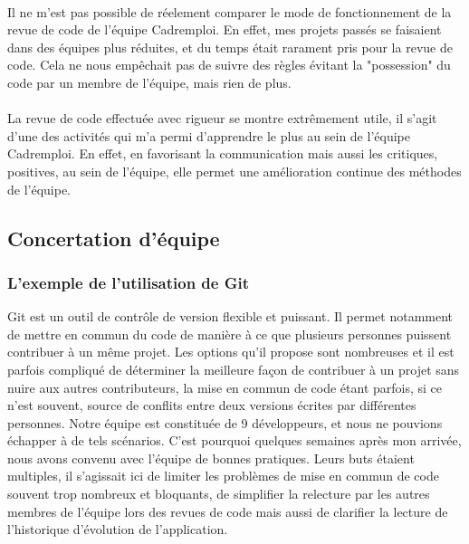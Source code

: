 \paragraph{}
Il ne m'est pas possible de réelement comparer le mode de fonctionnement de la revue de code de l'équipe Cadremploi.
En effet, mes projets passés se faisaient dans des équipes plus réduites, et du temps était rarament pris pour la revue de code.
Cela ne nous empêchait pas de suivre des règles évitant la "possession" du code par un membre de l'équipe, mais rien de plus.
\paragraph{}
La revue de code effectuée avec rigueur se montre extrêmement utile, il s'agit d'une des activités qui m'a permi d'apprendre le plus au sein de l'équipe Cadremploi.
En effet, en favorisant la communication mais aussi les critiques, positives, au sein de l'équipe, elle permet une amélioration continue des méthodes de l'équipe.

\subsection{Concertation d'équipe}
\label{sub:Concertation d'équipe}
\subsubsection{L'exemple de l'utilisation de Git}
\label{subs:Utilisation de Git}
Git est un outil de contrôle de version flexible et puissant.
Il permet notamment de mettre en commun du code de manière à ce que plusieurs personnes puissent contribuer à un même projet.
Les options qu'il propose sont nombreuses et il est parfois compliqué de déterminer la meilleure façon de contribuer à un projet sans nuire aux autres contributeurs, la mise en commun de code étant parfois, si ce n'est souvent, source de conflits entre deux versions écrites par différentes personnes.
Notre équipe est constituée de 9 développeurs, et nous ne pouvions échapper à de tels scénarios.
C'est pourquoi quelques semaines après mon arrivée, nous avons convenu avec l'équipe de bonnes pratiques.
Leurs buts étaient multiples, il s'agissait ici de limiter les problèmes de mise en commun de code souvent trop nombreux et bloquants, de simplifier la relecture par les autres membres de l'équipe lors des revues de code mais aussi de clarifier la lecture de l'historique d'évolution de l'application.
